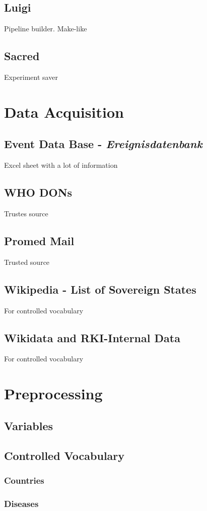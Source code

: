 \subsection{Luigi}
Pipeline builder. Make-like
\subsection{Sacred}
Experiment saver
\section{Data Acquisition}
\subsection{Event Data Base - \textit{Ereignisdatenbank}}
Excel sheet with a lot of information
\subsection{WHO DONs}
Trustes source
\subsection{Promed Mail}
Trusted source
\subsection{Wikipedia - List of Sovereign States}
For controlled vocabulary
\subsection{Wikidata and RKI-Internal Data}
For controlled vocabulary

\section{Preprocessing}
\subsection{Variables}

\subsection{Controlled Vocabulary}
\subsubsection{Countries}
\subsubsection{Diseases}

